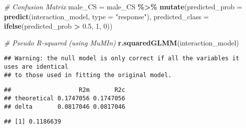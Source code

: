 \documentclass[
]{article}
\newenvironment{Shaded}{\begin{snugshade}}{\end{snugshade}}
\newcommand{\AttributeTok}[1]{\textcolor[rgb]{0.13,0.29,0.53}{#1}}
\newcommand{\CommentTok}[1]{\textcolor[rgb]{0.56,0.35,0.01}{\textit{#1}}}
\newcommand{\DecValTok}[1]{\textcolor[rgb]{0.00,0.00,0.81}{#1}}
\newcommand{\FloatTok}[1]{\textcolor[rgb]{0.00,0.00,0.81}{#1}}
\newcommand{\FunctionTok}[1]{\textcolor[rgb]{0.13,0.29,0.53}{\textbf{#1}}}
\newcommand{\NormalTok}[1]{#1}
\newcommand{\OtherTok}[1]{\textcolor[rgb]{0.56,0.35,0.01}{#1}}
\newcommand{\SpecialCharTok}[1]{\textcolor[rgb]{0.81,0.36,0.00}{\textbf{#1}}}
\newcommand{\StringTok}[1]{\textcolor[rgb]{0.31,0.60,0.02}{#1}}
\begin{document}
\begin{Shaded}
\begin{Highlighting}[]
\CommentTok{\# Confusion Matrix}
\NormalTok{male\_CS }\OtherTok{=}\NormalTok{ male\_CS }\SpecialCharTok{\%\textgreater{}\%}
  \FunctionTok{mutate}\NormalTok{(}\AttributeTok{predicted\_prob =} \FunctionTok{predict}\NormalTok{(interaction\_model, }\AttributeTok{type =} \StringTok{"response"}\NormalTok{),}
         \AttributeTok{predicted\_class =} \FunctionTok{ifelse}\NormalTok{(predicted\_prob }\SpecialCharTok{\textgreater{}} \FloatTok{0.5}\NormalTok{, }\DecValTok{1}\NormalTok{, }\DecValTok{0}\NormalTok{))}


\CommentTok{\# Pseudo R{-}squared (using MuMIn)}
\FunctionTok{r.squaredGLMM}\NormalTok{(interaction\_model)}
\end{Highlighting}
\end{Shaded}

\begin{verbatim}
## Warning: the null model is only correct if all the variables it uses are identical 
## to those used in fitting the original model.
\end{verbatim}

\begin{verbatim}
##                   R2m       R2c
## theoretical 0.1747056 0.1747056
## delta       0.0817046 0.0817046
\end{verbatim}

\begin{Shaded}
\end{Shaded}

\begin{verbatim}
## [1] 0.1186639
\end{verbatim}
\end{document}

